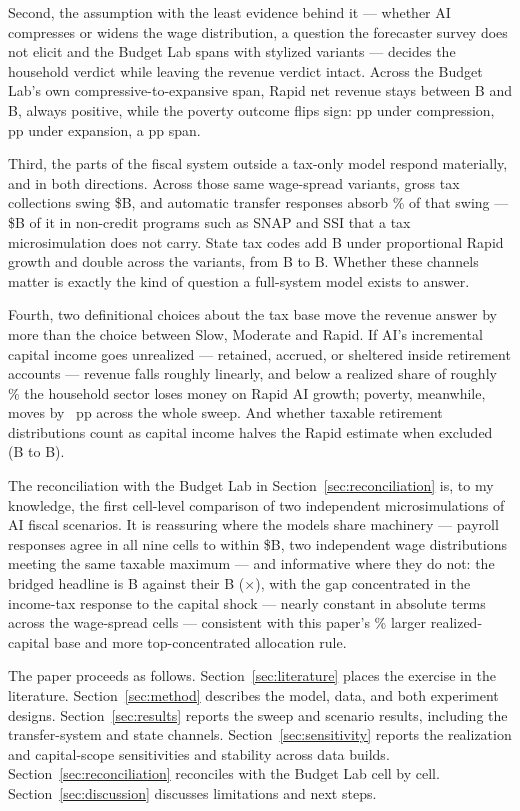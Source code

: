 Second, the assumption with the least evidence behind it --- whether AI
compresses or widens the wage distribution, a question the forecaster survey
does not elicit and the Budget Lab spans with stylized variants --- decides
the household verdict while leaving the revenue verdict intact. Across the Budget Lab's own
compressive-to-expansive span, Rapid net revenue stays between
\genRapidCompRev B and \genRapidExpRev B, always positive, while the poverty
outcome flips sign: \genRapidCompPovPp pp under compression,
\genRapidExpPovPp pp under expansion, a \genRapidPovSpanPp pp span.

Third, the parts of the fiscal system outside a tax-only model respond
materially, and in both directions. Across those same wage-spread variants,
gross tax collections swing \$\genGrossTaxSwing B, and automatic transfer
responses absorb \genTransferAbsorbPct\% of that swing ---
\$\genBenefitSwing B of it in non-credit programs such as SNAP and SSI that a
tax microsimulation does not carry. State tax codes add
\genRapidPropState B under proportional Rapid growth and double across the
variants, from \genRapidCompState B to \genRapidExpState B. Whether these
channels matter is exactly the kind of question a full-system model exists to
answer.

Fourth, two definitional choices about the tax base move the revenue answer
by more than the choice between Slow, Moderate and Rapid. If AI's incremental
capital income goes unrealized --- retained, accrued, or sheltered inside
retirement accounts --- revenue falls roughly linearly, and below a realized
share of roughly \genRealBreakevenPct\% the household sector loses money on
Rapid AI growth; poverty, meanwhile, moves by
\genRealPovSpanPp~pp across the whole sweep. And whether
taxable retirement distributions count as capital income halves the Rapid
estimate when excluded (\genRapidScopeFull B to \genRapidScopeExcl B).

The reconciliation with the Budget Lab in Section~\ref{sec:reconciliation} is,
to my knowledge, the first cell-level comparison of two independent
microsimulations of AI fiscal scenarios. It is reassuring where the models
share machinery --- payroll responses agree in all nine cells to within
\$\genPayrollMaxCellGap B, two independent wage distributions meeting the
same taxable maximum --- and
informative where they do not: the bridged headline is \genBridgeOursTotal B
against their \genBridgeTheirsTotal B (\genBridgeRatio$\times$), with the gap
concentrated in the income-tax response to the capital shock --- nearly
constant in absolute terms across the wage-spread cells --- consistent with
this paper's \genBaseGapPct\% larger realized-capital base and more
top-concentrated allocation rule.

The paper proceeds as follows. Section~\ref{sec:literature} places the
exercise in the literature. Section~\ref{sec:method} describes the model,
data, and both experiment designs. Section~\ref{sec:results} reports the
sweep and scenario results, including the transfer-system and state channels.
Section~\ref{sec:sensitivity} reports the realization and capital-scope
sensitivities and stability across data builds.
Section~\ref{sec:reconciliation} reconciles with the Budget Lab cell by cell.
Section~\ref{sec:discussion} discusses limitations and next steps.
